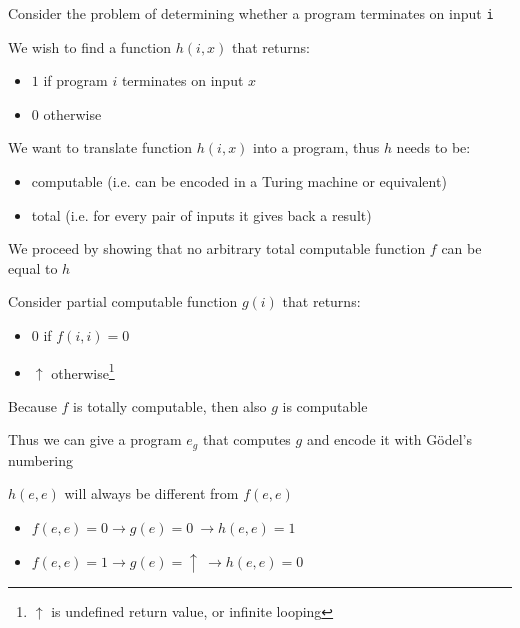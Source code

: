 \documentclass{beamer}
\begin{document}
\begin{slide}{
\item Consider the problem of determining whether a program terminates on input \texttt{i}
\item We wish to find a function $h(i,x)$ that returns:
\begin{itemize}
\item $1$ if program $i$ terminates on input $x$
\item $0$ otherwise
\end{itemize}
}\end{slide}

\begin{slide}{
\item We want to translate function $h(i,x)$ into a program, thus $h$ needs to be:
\begin{itemize}
\item computable (i.e. can be encoded in a Turing machine or equivalent)
\item total (i.e. for every pair of inputs it gives back a result)
\end{itemize}
}\end{slide}

\begin{slide}{
\item We proceed by showing that no arbitrary total computable function $f$ can be equal to $h$
\item Consider partial computable function $g(i)$ that returns:
\begin{itemize}
\item $0$ if $f(i,i)=0$
\item $\uparrow$ otherwise\footnote{$\uparrow$ is undefined return value, or infinite looping}
\end{itemize}
}\end{slide}

\begin{slide}{
\item Because $f$ is totally computable, then also $g$ is computable
\item Thus we can give a program $e_g$ that computes $g$ and encode it with Gödel's numbering
}\end{slide}

\begin{slide}{
\item $h(e,e)$ will always be different from $f(e,e)$
\begin{itemize}
\item $f(e,e)=0 \rightarrow g(e)=0 \ \rightarrow h(e,e)=1$
\item $f(e,e)=1 \rightarrow g(e)=\uparrow \ \rightarrow h(e,e)=0$
\end{itemize}
}\end{slide}
\end{document}
